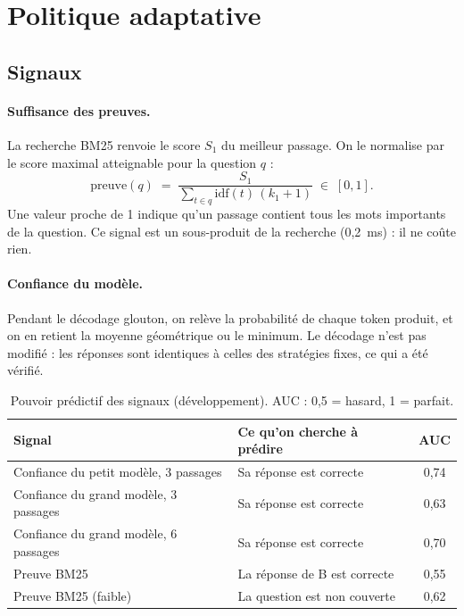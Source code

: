 \documentclass[11pt,a4paper]{article}
\begin{document}
\section{Politique adaptative}\label{sec:politique}

\subsection{Signaux}

\paragraph{Suffisance des preuves.} La recherche BM25 renvoie le score $S_1$ du meilleur passage. On le
normalise par le score maximal atteignable pour la question $q$ :
\[
\text{preuve}(q) \;=\; \frac{S_1}{\sum_{t \in q} \mathrm{idf}(t)\,(k_1+1)} \;\in\; [0,1].
\]
Une valeur proche de 1 indique qu'un passage contient tous les mots importants de la question. Ce
signal est un sous-produit de la recherche (0,2~ms) : il ne coûte rien.

\paragraph{Confiance du modèle.} Pendant le décodage glouton, on relève la probabilité de chaque token
produit, et on en retient la moyenne géométrique ou le minimum. Le décodage n'est pas modifié : les
réponses sont identiques à celles des stratégies fixes, ce qui a été vérifié.

\begin{table}[H]
\centering\small
\begin{tabular}{l l c}
\toprule
\textbf{Signal} & \textbf{Ce qu'on cherche à prédire} & \textbf{AUC} \\
\midrule
Confiance du petit modèle, 3 passages & Sa réponse est correcte & 0,74 \\
Confiance du grand modèle, 3 passages & Sa réponse est correcte & 0,63 \\
Confiance du grand modèle, 6 passages & Sa réponse est correcte & 0,70 \\
Preuve BM25 & La réponse de B est correcte & 0,55 \\
Preuve BM25 (faible) & La question est non couverte & 0,62 \\
\bottomrule
\end{tabular}
\caption{Pouvoir prédictif des signaux (développement). AUC : 0,5 = hasard, 1 = parfait.}
\label{tab:auc}
\end{table}
\end{document}
